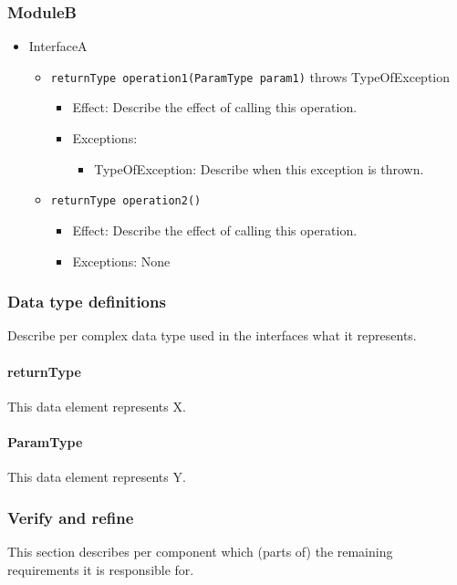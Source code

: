 \documentclass[a4paper,10pt]{article}
\begin{document}
\subsubsection*{ModuleB}
\begin{itemize}
    \item InterfaceA
    \begin{itemize}
        \item \texttt{returnType operation1(ParamType param1)} throws TypeOfException
        \begin{itemize}
            \item Effect: Describe the effect of calling this operation.
            \item Exceptions:
            \begin{itemize}
                \item TypeOfException: Describe when this exception is thrown.
            \end{itemize}
        \end{itemize}

        \item \texttt{returnType operation2()}
        \begin{itemize}
            \item Effect: Describe the effect of calling this operation.
            \item Exceptions: None
         \end{itemize}
    \end{itemize}
\end{itemize}

\subsubsection{Data type definitions}
Describe per complex data type used in the interfaces what it represents.

\paragraph{returnType} This data element represents X.

\paragraph{ParamType} This data element represents Y.

\subsubsection{Verify and refine}
This section describes per component which (parts of) the remaining
requirements it is responsible for.
\end{document}
